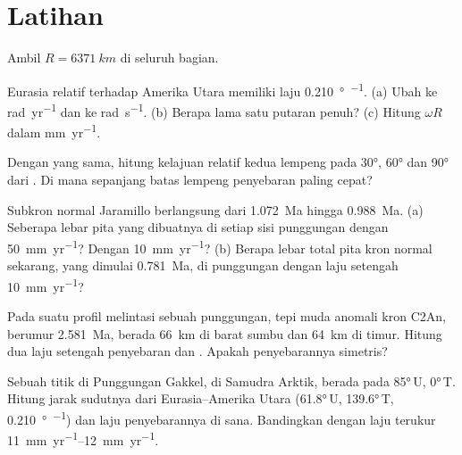 \section{Latihan}

Ambil $R = \qty{6371}{km}$ di seluruh bagian.

\begin{exercise}[$\star$]\label{exo:b1:plate-kinematics:1}
 Eurasia relatif terhadap Amerika Utara memiliki laju \qty{0.210}{\degree\per\Ma}. (a) Ubah ke \unit{rad.yr^{-1}} dan ke \unit{rad.s^{-1}}. (b) Berapa lama satu putaran penuh? (c) Hitung $\omega R$ dalam \unit{mm.yr^{-1}}.
\end{exercise}

\begin{exercise}[$\star$]\label{exo:b1:plate-kinematics:2}
Dengan  yang sama, hitung kelajuan relatif kedua lempeng pada \ang{30}, \ang{60} dan \ang{90} dari . Di mana sepanjang batas lempeng penyebaran paling cepat?
\end{exercise}

\begin{exercise}[$\star$]\label{exo:b1:plate-kinematics:3}
Subkron normal Jaramillo berlangsung dari \qty{1.072}{Ma} hingga \qty{0.988}{Ma}. (a) Seberapa lebar pita yang dibuatnya di setiap sisi punggungan dengan  \qty{50}{mm.yr^{-1}}? Dengan \qty{10}{mm.yr^{-1}}? (b) Berapa lebar total pita kron normal sekarang, yang dimulai \qty{0.781}{Ma}, di punggungan dengan laju setengah \qty{10}{mm.yr^{-1}}?
\end{exercise}

\begin{exercise}[$\star$]\label{exo:b1:plate-kinematics:4}
Pada suatu profil melintasi sebuah punggungan, tepi muda anomali kron C2An, berumur \qty{2.581}{Ma}, berada \qty{66}{km} di barat sumbu dan \qty{64}{km} di timur. Hitung dua laju setengah penyebaran dan . Apakah penyebarannya simetris?
\end{exercise}

\begin{exercise}[$\star\star$]\label{exo:b1:plate-kinematics:5}
Sebuah titik di Punggungan Gakkel, di Samudra Arktik, berada pada \ang{85}\,U, \ang{0}\,T. Hitung jarak sudutnya dari  Eurasia--Amerika Utara (\ang{61.8}\,U, \ang{139.6}\,T, \qty{0.210}{\degree\per\Ma}) dan laju penyebarannya di sana. Bandingkan dengan laju terukur \qtyrange{11}{12}{mm.yr^{-1}}.
\end{exercise}

